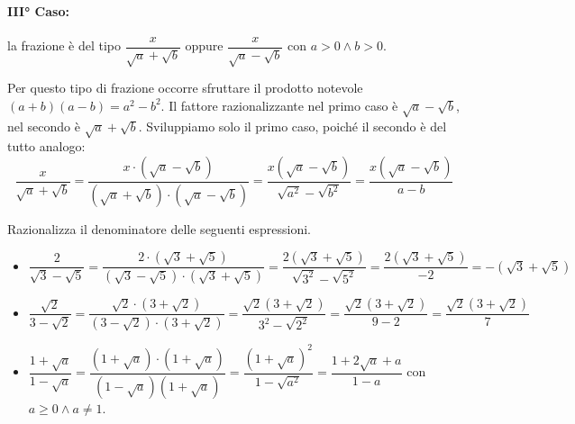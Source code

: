 \paragraph{III° Caso:} 
la frazione è del tipo $\dfrac x{\sqrt a+\sqrt b}$ 
oppure $\dfrac x{\sqrt a-\sqrt b}$ con $a>0 \wedge b>0$.

Per questo tipo di frazione occorre sfruttare il prodotto notevole 
$(a+b)(a-b)=a^2-b^2$. Il fattore razionalizzante nel primo caso è $\sqrt 
a-\sqrt b$, nel secondo è $\sqrt a+\sqrt b$.
Sviluppiamo solo il primo caso, poiché il secondo è del tutto analogo:
\begin{equation*}
\dfrac x{\sqrt a+\sqrt b}=
\dfrac{x\cdot (\sqrt a-\sqrt b)}{(\sqrt a+\sqrt b)\cdot (\sqrt a-\sqrt b)}=
\dfrac{x(\sqrt a-\sqrt b)}{\sqrt{a^2}-\sqrt{b^2}}=
\dfrac{x(\sqrt a-\sqrt b)}{a-b}
\end{equation*}

 \begin{esempio}
Razionalizza il denominatore delle seguenti espressioni.
\begin{itemize}
 \item $\dfrac 2{\sqrt 3-\sqrt 5}=
 \dfrac{2\cdot (\sqrt 3+\sqrt 5)}{(\sqrt 3-\sqrt 5)\cdot (\sqrt 3+\sqrt 5)}=
 \dfrac{2(\sqrt 3+\sqrt 5)}{\sqrt{3^2}-\sqrt{5^2}}=
 \dfrac{2(\sqrt 3+\sqrt 5)}{-2}=-(\sqrt 3+\sqrt 5)$
 \item $\dfrac{\sqrt 2}{3-\sqrt 2}=
 \dfrac{\sqrt 2\cdot (3+\sqrt 2)}{(3-\sqrt 2)\cdot (3+\sqrt 2)}=
 \dfrac{\sqrt 2(3+\sqrt 2)}{3^2-\sqrt{2^2}}=\dfrac{\sqrt 2(3+\sqrt 2)}{9-2}=
 \dfrac{\sqrt 2(3+\sqrt 2)} 7$
 \item $\dfrac{1+\sqrt a}{1-\sqrt a}=
 \dfrac{(1+\sqrt a)\cdot (1+\sqrt a)}{(1-\sqrt a)(1+\sqrt a)}=
 \dfrac{(1+\sqrt a)^2}{1-\sqrt{a^2}}=\dfrac{1+2\sqrt a+a}{1-a}$ 
 con $a\ge 0\wedge a\neq 1$.
\end{itemize}
 \end{esempio}


